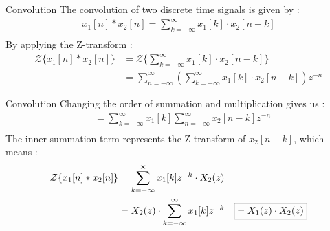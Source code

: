 \documentclass{beamer}
\begin{document}
\begin{frame}{Convolution}
    The convolution of two discrete time signals is given by :
    \begin{align*}
        x_1[n] \ast x_2[n] = \sum_{k=-\infty}^{\infty} x_1[k]\cdot x_2[n-k] \\
    \end{align*}
    By applying the Z-transform :
    \begin{align*}
        \mathcal{Z}\{ x_1[n] \ast x_2[n] \} &= \mathcal{Z}\{\sum_{k=-\infty}^{\infty} x_1[k] \cdot x_2[n-k] \} \\
        &= \sum_{n=-\infty}^{\infty} (\sum_{k=-\infty}^{\infty} x_1[k] \cdot x_2[n-k]) z^{-n}
    \end{align*}
\end{frame}
\begin{frame}{Convolution}
    Changing the order of summation and multiplication gives us :
    \begin{align*}
        &= \sum_{k=-\infty}^{\infty} x_1[k] \sum_{n=-\infty}^{\infty} x_2[n-k] z^{-n} \\
    \end{align*}
    The inner summation term represents the Z-transform of $x_2[n-k]$, which means :
    \begin{align*}
        \mathcal{Z}\{ x_1[n] \ast x_2[n] \} &= \sum_{k=-\infty}^{\infty} x_1[k] z^{-k} \cdot X_2(z)\\
        &= X_2(z) \cdot \sum_{k=-\infty}^{\infty} x_1[k] z^{-k}
        \Aboxed{&= X_1(z) \cdot X_2(z)}
    \end{align*}
\end{frame}
\end{document}

